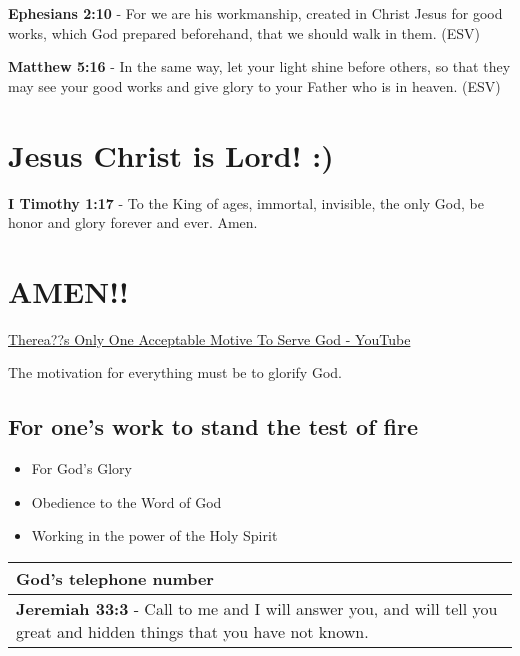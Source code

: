 \documentclass[11pt]{article}
\begin{document}
\textbf{Ephesians 2:10} - For we are his workmanship, created in Christ Jesus for good works, which God prepared beforehand, that we should walk in them. (ESV)

\textbf{Matthew 5:16} - In the same way, let your light shine before others, so that they may see your good works and give glory to your Father who is in heaven. (ESV)

\section{Jesus Christ is Lord! :)}
\label{sec:org00c5989}
\textbf{I Timothy 1:17} - To the King of ages, immortal, invisible, the only God, be honor and glory forever and ever. Amen.

\section{AMEN!!}
\label{sec:orgc585078}
\href{https://www.youtube.com/watch?v=TEa3UWFgwnk}{Therea??s Only One Acceptable Motive To Serve God - YouTube}

The motivation for everything must be to glorify God.

\subsection{For one's work to stand the test of fire}
\label{sec:org35a103f}
\begin{itemize}
\item For God's Glory
\item Obedience to the Word of God
\item Working in the power of the Holy Spirit
\end{itemize}

\begin{center}
\begin{tabular}{l}
God's telephone number\\[0pt]
\hline
\textbf{Jeremiah 33:3} - Call to me and I will answer you, and will tell you great and hidden things that you have not known.\\[0pt]
\end{tabular}
\end{center}
\end{document}
